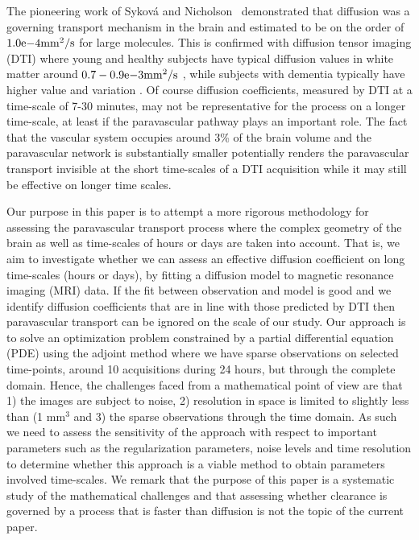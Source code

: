 \documentclass[11pt,a4paper]{article}
\begin{document}
The pioneering work of Sykov{\'a} and Nicholson~\cite{sykova2008diffusion} demonstrated
that diffusion was a governing transport mechanism in the brain and estimated to be on the order
of $1.0\mathrm{e}{-4} \mathrm{mm\sp{2}/s}$ for large molecules. This is confirmed with diffusion tensor imaging (DTI) where young and healthy subjects have typical diffusion values in white matter around $0.7-0.9\mathrm{e}{-3} \mathrm{mm\sp{2}/s}$ \citet{Helenius194},
while subjects with dementia typically have higher value and variation \cite{goujon2018can} . Of course diffusion coefficients, 
measured by DTI at a time-scale of 7-30 minutes, may not be representative for the process on a
longer time-scale, at least if the paravascular pathway plays an important role. The fact that the vascular system occupies around 3\% of the brain volume 
and the paravascular network is substantially smaller potentially renders the paravascular transport  invisible at the short time-scales of a DTI acquisition while it may still be effective on longer time scales. 


Our purpose in this paper is to attempt a more rigorous methodology 
for assessing the paravascular transport process where
the complex geometry of the brain as well as time-scales of hours or days are taken into account.
That is, we aim to investigate whether we can assess an effective diffusion coefficient on long time-scales (hours or days), by fitting a diffusion model to magnetic resonance imaging (MRI) data. If the fit between observation and model is good and we identify diffusion coefficients that are 
in line with those predicted by DTI then paravascular transport can be ignored on the scale of our study. 
Our approach is to solve an optimization problem constrained by a partial differential equation (PDE) using the adjoint method where we have sparse observations on selected time-points, around 10 acquisitions during 24 hours, but through
the complete domain. Hence, the challenges faced from a mathematical point of view 
are that 1) the images are subject to noise, 2) resolution in space is limited to slightly less than (1 $\mathrm{mm}^3$ and 3)
the sparse observations through the time domain.  As such we need to assess the sensitivity of
the approach with respect to important parameters such as the regularization parameters, noise levels and 
time resolution to determine whether this approach is a viable method
to obtain parameters involved time-scales. We remark that the purpose
of this paper is a systematic study of the mathematical challenges and that assessing  
whether clearance is governed by a process that is faster than diffusion is not the topic of the current paper. 
\end{document}
